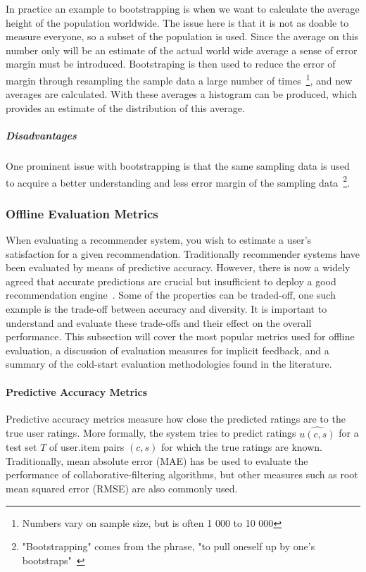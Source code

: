 In practice an example to bootstrapping is when we want to calculate the average height of the population worldwide.
The issue here is that it is not as doable to measure everyone, so a subset of the population is used.
Since the average on this number only will be an estimate of the actual world wide average a sense of error margin must be introduced.
Bootstraping is then used to reduce the error of margin through resampling the sample data a large number of times~\footnote{Numbers vary on sample size, but is often 1 000 to 10 000}, and new averages are calculated.
With these averages a histogram can be produced, which provides an estimate of the distribution of this average.

\subparagraph{Disadvantages}
One prominent issue with bootstrapping is that the same sampling data is used to acquire a better understanding and less error margin of the sampling data~\footnote{"Bootstrapping" comes from the phrase, "to pull oneself up by one's bootstraps"~\cite{bootstrapSaying1843}}.


\subsubsection{Offline Evaluation Metrics}
When evaluating a recommender system, you wish to estimate a user's
satisfaction for a given recommendation. Traditionally recommender systems have
been evaluated by means of predictive accuracy. However, there is now a widely
agreed that accurate predictions are crucial but insufficient to deploy a good
recommendation engine~\cite{Shani2011, McNee2006}. Some of the properties can
be traded-off, one such example is the trade-off between accuracy and
diversity. It is important to understand and evaluate these trade-offs and
their effect on the overall performance. This subsection will cover the most
popular metrics used for offline evaluation, a discussion of evaluation
measures for implicit feedback, and a summary of the cold-start evaluation
methodologies found in the literature.

\paragraph{Predictive Accuracy Metrics}

Predictive accuracy metrics measure how close the predicted ratings are to the
true user ratings. More formally, the system tries to predict ratings
$\hat{u(c,s)}$ for a test set $T$ of user.item pairs $(c, s)$ for which the
true ratings are known. Traditionally, mean absolute error (MAE) has be used to
evaluate the performance of collaborative-filtering algorithms, but other
measures such as root mean squared error (RMSE) are also commonly used.


